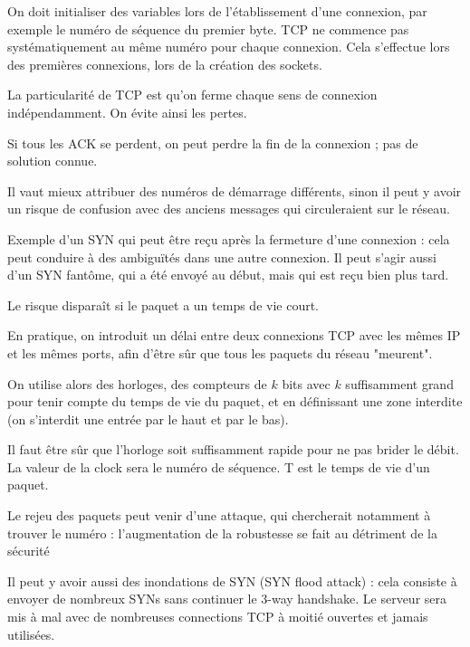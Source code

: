 	On doit initialiser des variables lors de l'établissement d'une connexion, par exemple le numéro de séquence du premier byte. TCP ne commence pas systématiquement au même numéro pour chaque connexion. Cela s'effectue lors des premières connexions, lors de la création des sockets.
	
	
	La particularité de TCP est qu'on ferme chaque sens de connexion indépendamment. On évite ainsi les pertes.
	
	
	
	Si tous les ACK se perdent, on peut perdre la fin de la connexion ; pas de solution connue.
	
	Il vaut mieux attribuer des numéros de démarrage différents, sinon il peut y avoir un risque de confusion avec des anciens messages qui circuleraient sur le réseau.
	
	Exemple d'un SYN qui peut être reçu après la fermeture d'une connexion : cela peut conduire à des ambiguïtés dans une autre connexion. Il peut s'agir aussi d'un SYN fantôme, qui a été envoyé au début, mais qui est reçu bien plus tard.
	
	
	Le risque disparaît si le paquet a un temps de vie court.
	
	
	En pratique, on introduit un délai entre deux connexions TCP avec les mêmes IP et les mêmes ports, afin d'être sûr que tous les paquets du réseau "meurent". 
	
	On utilise alors des horloges, des compteurs de $k$ bits avec $k$ suffisamment grand pour tenir compte du temps de vie du paquet, et en définissant une zone interdite (on s'interdit une entrée par le haut et par le bas).
	
	
	Il faut être sûr que l'horloge soit suffisamment rapide pour ne pas brider le débit. La valeur de la clock sera le numéro de séquence. T est le temps de vie d'un paquet.
	
	Le rejeu des paquets peut venir d'une attaque, qui chercherait notamment à trouver le numéro : l'augmentation de la robustesse se fait au détriment de la sécurité
	
	Il peut y avoir aussi des inondations de SYN (SYN flood attack) : cela consiste à envoyer de nombreux SYNs sans continuer le 3-way handshake. Le serveur sera mis à mal avec de nombreuses connections TCP à moitié ouvertes et jamais utilisées.
		
